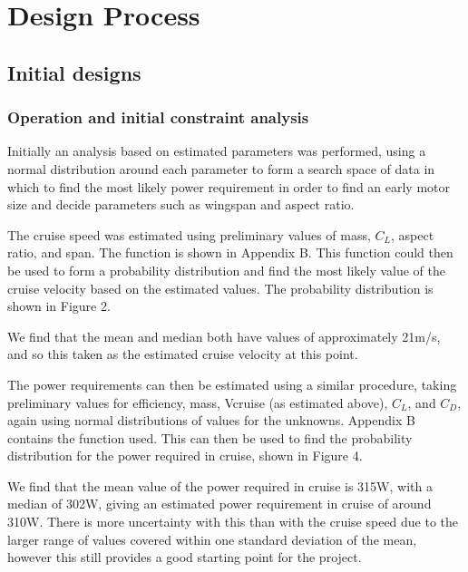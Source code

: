 \documentclass[../../main.tex]{subfiles}
\begin{document}
\chapter{Design Process} \label{chapter:design-process}

\section{Initial designs} \label{sec:design-process:initial-designs}

\subsection{Operation and initial constraint analysis} \label{sec:design-process:initial-designs:operation-and-initial-constraint-analysis}

Initially an analysis based on estimated parameters was performed, using a normal distribution around each parameter to form a search space of data in which to find the most likely power requirement in order to find an early motor size and decide parameters such as wingspan and aspect ratio. 

The cruise speed was estimated using preliminary values of mass, $C_L$, aspect ratio, and span. The function is shown in Appendix B.
This function could then be used to form a probability distribution and find the most likely value of the cruise velocity based on the estimated values.
The probability distribution is shown in Figure 2.


We find that the mean and median both have values of approximately 21m/s, and so this taken as the estimated cruise velocity at this point. 

The power requirements can then be estimated using a similar procedure, taking preliminary values for efficiency, mass, Vcruise (as estimated above), $C_L$, and $C_D$, again using normal distributions of values for the unknowns.
Appendix B contains the function used.
This can then be used to find the probability distribution for the power required in cruise, shown in Figure 4.


We find that the mean value of the power required in cruise is 315W, with a median of 302W, giving an estimated power requirement in cruise of around 310W.
There is more uncertainty with this than with the cruise speed due to the larger range of values covered within one standard deviation of the mean, however this still provides a good starting point for the project.
\end{document}
